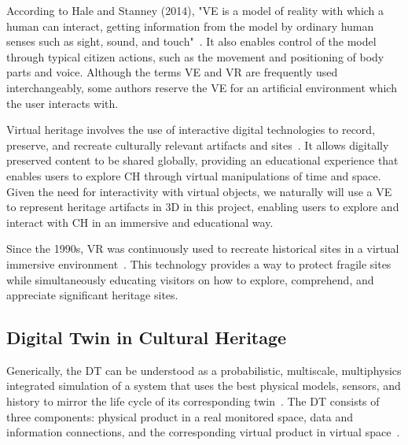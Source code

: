 According to Hale and Stanney (2014), "\gls{VE} is a model of reality with which a human can interact, getting information 
from the model by ordinary human senses such as sight, sound, and touch"~\cite{hale2014handbook}. 
It also enables control of the model through typical citizen actions, such as the movement and positioning of body parts and voice. 
Although the terms \gls{VE} and \gls{VR} are frequently used interchangeably, some authors reserve the \gls{VE} for an artificial environment which the user interacts with.

Virtual heritage involves the use of interactive digital technologies to record, preserve, and recreate 
culturally relevant artifacts and sites~\cite{848434}. It allows digitally preserved content to be shared globally, providing an educational experience that enables users to explore \gls{CH} through virtual manipulations of time and space. 
Given the need for interactivity with virtual objects, we naturally will use a \gls{VE} to represent heritage artifacts 
in \gls{3D} in this project, enabling users to explore and interact with \gls{CH} in an immersive and educational way.

Since the 1990s, \gls{VR} was continuously used to recreate historical sites in a virtual immersive environment~\cite{hale2014handbook}. 
This technology provides a way to protect fragile sites while simultaneously educating visitors on how to explore, comprehend, and appreciate significant heritage sites.

\subsection{Digital Twin in Cultural Heritage}
\label{sec:digital_twin}


Generically, the \gls{DT} can be understood as a probabilistic, multiscale,
multiphysics integrated simulation of a system that uses the best physical models,
sensors, and history to mirror the life cycle of its corresponding twin~\cite{dezen2020towards}.
The \gls{DT} consists of three components: physical product in a real monitored
space, data and information connections, and the corresponding virtual product
in virtual space~\cite{grieves2017digital}.


